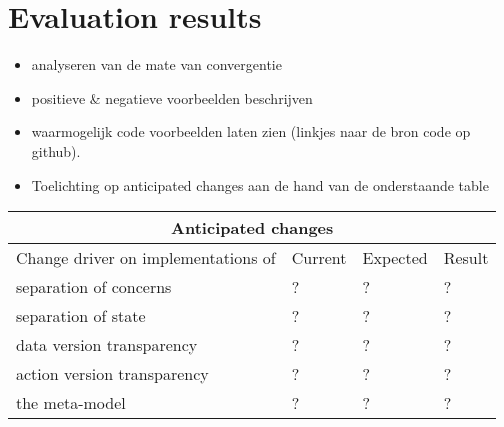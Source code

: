 \chapter{Evaluation results} \label{evaluation}

\begin{itemize}
    \item analyseren van de mate van convergentie
    \item positieve \& negatieve voorbeelden beschrijven
    \item waarmogelijk code voorbeelden laten zien (linkjes naar de bron code op github).
    \item Toelichting op anticipated changes aan de hand van de onderstaande table
\end{itemize}

\begin{tabular}{ |p{7cm}||p{2cm}|p{2cm}|p{2cm}|  }
    \hline
    \multicolumn{4}{|c|}{Anticipated changes} \\
    \hline
    Change driver on implementations of &Current &Expected &Result\\
    \hline
    separation of concerns &? &? &?\\
    separation of state &? &? &?\\
    data version transparency &? &? &?\\
    action version transparency &? &? &?\\
    the meta-model &? &? &?\\
    \hline
   \end{tabular}
